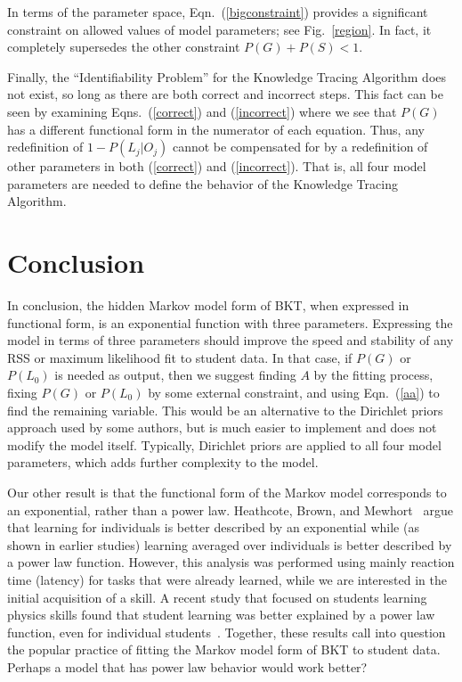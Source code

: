 \documentclass{acmlarge-edm}
\begin{document}
In terms of the parameter space, Eqn.~(\ref{bigconstraint})
provides a significant constraint on allowed values of model
parameters; see Fig.~\ref{region}.  In fact, it completely supersedes the
other constraint $P(G)+P(S)<1$.

Finally, the ``Identifiability Problem'' for the Knowledge Tracing Algorithm
does not exist, so long as there are both correct and incorrect steps.
This fact can be seen by examining Eqns.~(\ref{correct}) and (\ref{incorrect})
where we see that $P(G)$ has a different functional form in
the numerator of each equation.  Thus, any redefinition of $1-P(L_j|O_j)$ 
cannot be compensated for by a redefinition
of other parameters in both  (\ref{correct}) and (\ref{incorrect}).
That is, all four model parameters are needed to define the behavior
of the Knowledge Tracing Algorithm.


\section{Conclusion}


In conclusion, the hidden Markov model form of BKT, when expressed
in functional form, is an exponential function with three parameters.
Expressing the model in terms of three parameters should 
improve the speed and stability of any RSS or maximum likelihood 
fit to student data.  In that case, if $P(G)$ or
$P(L_0)$ is needed as output, then we suggest finding $A$ by
the fitting process,  fixing $P(G)$ or $P(L_0)$ by some 
external constraint, and using Eqn.~(\ref{aa}) to find the remaining
variable.
This would be an alternative to the Dirichlet 
priors~\cite{beck_identifiability:_2007} approach used by
some authors, but is much easier to implement and does not
modify the model itself.  Typically, Dirichlet priors are applied
to all four model parameters, which adds further complexity to the
model. 

Our other result is that the functional form of the Markov model 
corresponds to an exponential, rather than a power law.  
Heathcote, Brown, and Mewhort~\citeyear{heathcote_power_2000}
argue that learning for individuals is better described by an
exponential while (as shown in earlier studies) learning averaged
over individuals is better described by a power law function.
However, this analysis was performed using mainly reaction time
(latency) for tasks that were already learned, while we are interested
in the initial acquisition of a skill.  A recent study that focused
on students learning physics skills found that student learning
was better explained by a power law function, even for individual 
students~\cite{chi_instructional_2011}.
Together, these results call into question the popular practice of 
fitting the Markov model form of BKT to student data. 
Perhaps a model that has power law behavior would work better?
\end{document}
